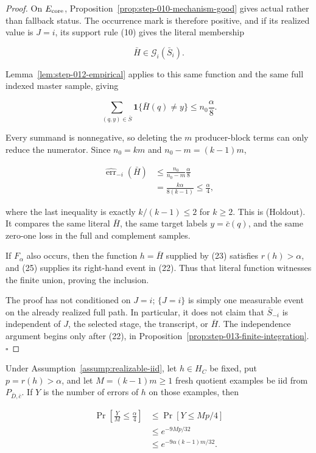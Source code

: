 \begin{proof}
On \(E_{\rm core}\), Proposition~\ref{prop:step-010-mechanism-good} gives actual rather than
fallback status. The occurrence mark is therefore positive, and
if its realized value is \(J=i\), its support rule (10) gives the literal
membership

\[
 \bar H\in\mathcal G_i(\bar S_i).
 \tag{23}
\]

Lemma~\ref{lem:step-012-empirical} applies to this same function
and the same full indexed master sample, giving

\[
 \sum_{(q,y)\in\bar S}
   \mathbf1\{\bar H(q)\ne y\}
 \leq n_0\frac\alpha8.
 \tag{24}
\]

Every summand is nonnegative, so deleting the \(m\) producer-block terms
can only reduce the numerator. Since \(n_0=km\) and
\(n_0-m=(k-1)m\),

\[
\begin{aligned}
 \widehat{\operatorname{err}}_{-i}(\bar H)
 &\leq\frac{n_0}{n_0-m}\frac\alpha8\\
 &=\frac{k\alpha}{8(k-1)}
 \leq\frac\alpha4,
\end{aligned}
 \tag{25}
\]

where the last inequality is exactly \(k/(k-1)\leq2\) for \(k\geq2\).
This is (Holdout). It compares the same literal \(\bar H\), the same target
labels \(y=\bar c(q)\), and the same zero-one loss in the full and
complement samples.

If \(F_\alpha\) also occurs, then the function \(h=\bar H\) supplied by
(23) satisfies \(r(h)>\alpha\), and (25) supplies its right-hand event in
(22). Thus that literal function witnesses the finite union, proving the
inclusion.

The proof has not conditioned on \(J=i\); \(\{J=i\}\) is simply one
measurable event on the already realized full path. In particular, it does
not claim that \(\bar S_{-i}\) is independent of \(J\), the selected stage,
the transcript, or \(\bar H\). The independence argument begins only after
(22), in Proposition~\ref{prop:step-013-finite-integration}. \(\square\)


\end{proof}

\begin{lemma}\label{lem:step-013-lower-tail}
Under Assumption~\ref{assump:realizable-iid}, let \(h\in H_C\) be fixed,
put \(p=r(h)>\alpha\), and let \(M=(k-1)m\geq1\) fresh quotient examples
be iid from \(P_{\bar D,\bar c}\). If \(Y\) is the number of errors of
\(h\) on those examples, then

\[
\begin{aligned}
 \Pr\left[\frac YM\leq\frac\alpha4\right]
 &\leq \Pr[Y\leq Mp/4]\\
 &\leq e^{-9Mp/32}\\
 &\leq e^{-9\alpha(k-1)m/32}.
\end{aligned}
 \tag{26}
\]


\end{lemma}

